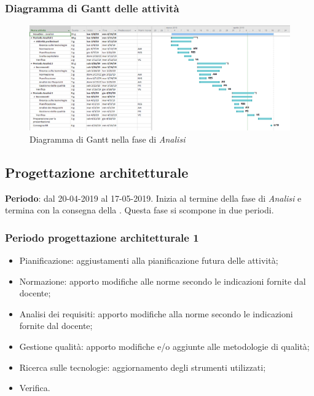         \subsubsection{Diagramma di Gantt delle attività}
            \begin{figure}[H]
                \centering
                \includegraphics[width=\textwidth,height=\textheight,keepaspectratio]{immagini/gantt/GantRR.png}
                \caption{Diagramma di Gantt nella fase di \textit{Analisi}}
            \end{figure}
    
    \subsection{Progettazione architetturale}
    \textbf{Periodo}: dal 20-04-2019 al 17-05-2019. \newline
    Inizia al termine della fase di \textit{Analisi} e termina con la consegna della \RP.
    Questa fase si scompone in due periodi.

        \subsubsection{Periodo progettazione architetturale 1}
            \begin{itemize}
                \item Pianificazione: aggiustamenti alla pianificazione futura delle attività;
                \item Normazione: apporto modifiche alle norme secondo le indicazioni fornite dal docente;
                \item Analisi dei requisiti: apporto modifiche alla norme secondo le indicazioni fornite dal docente;
                \item Gestione qualità: apporto modifiche e/o aggiunte alle metodologie di qualità;
                \item Ricerca sulle tecnologie: aggiornamento degli strumenti utilizzati;
                \item Verifica.
            \end{itemize}
        
